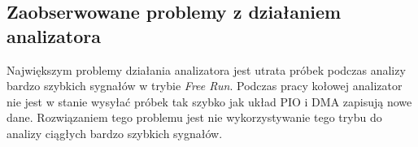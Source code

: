     \subsection{Zaobserwowane problemy z działaniem analizatora}
        Największym problemy działania analizatora jest utrata próbek podczas analizy bardzo szybkich sygnałów w trybie \textit{Free Run}.
        Podczas pracy kołowej analizator nie jest w stanie wysyłać próbek tak szybko jak układ PIO i DMA zapisują nowe dane.
        Rozwiązaniem tego problemu jest nie wykorzystywanie tego trybu do analizy ciągłych bardzo szybkich sygnałów.


    